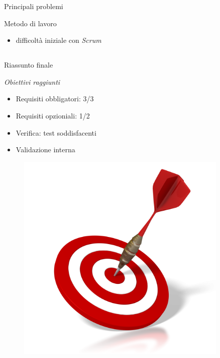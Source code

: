 \begin{frame}{Principali problemi}
\begin{minipage}{0.3\textwidth}
\begin{figure}
				\end{figure}
			\end{minipage}
			\begin{minipage}{0.6\textwidth}
				\begin{block}{Metodo di lavoro}
					\begin{itemize}
						\item difficoltà iniziale con \emph{Scrum}
					\end{itemize}
				\end{block}
			\end{minipage}
		\end{frame}
	\subsection{}
		\begin{frame}{Riassunto finale}
			\begin{minipage}{0.6\textwidth}
				\emph{Obiettivi raggiunti}
				\begin{itemize}
					\item Requisiti obbligatori: 3/3
					\item Requisiti opzioniali: 1/2
					\item Verifica: test soddisfacenti
					\item Validazione interna
				\end{itemize}
			\end{minipage}
			\begin{minipage}{0.3\textwidth}
				\begin{figure}
					\includegraphics[width=0.9\textwidth]{capitolo_4/immagini/obiettivo.png}

\end{figure}
\end{minipage}
\end{frame}

